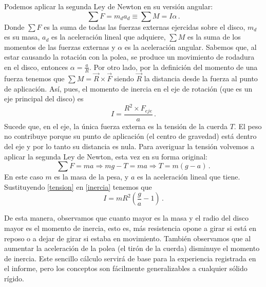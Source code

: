 \documentclass[a4paper]{article}
\begin{document}
Podemos aplicar la segunda Ley de Newton en su versión angular:
\begin{equation}
\sum F=m_d a_d\equiv \sum M=I\alpha\,.
\end{equation}
Donde $\sum F$ es la suma de todas las fuerzas externas ejercidas sobre el disco, $m_d$ es su masa, $a_d$ es la aceleración lineal que adquiere, $\sum M$ es la suma de los momentos de las fuerzas externas  y $\alpha$ es la aceleración angular.
Sabemos que, al estar causando la rotación con la polea, se produce un movimiento de rodadura en el disco, entonces $\alpha=\frac{a}{R}$. Por otro lado, por la definición del momento de una fuerza tenemos que $\sum M=\vec{R}\times\vec{F}$ siendo $\vec{R}$ la distancia desde la fuerza al punto de aplicación. Así, pues, el momento de inercia en el eje de rotación (que es un eje principal del disco) es 
\begin{equation}
I=\frac{R^2\times F_{eje}}{a}\,.
\label{inercia}
\end{equation}
Sucede que, en el eje, la única fuerza externa es la tensión de la cuerda $T$. El peso no contribuye porque su punto de aplicación (el centro de gravedad) está dentro del eje y por lo tanto su distancia es nula. Para averiguar la tensión volvemos a aplicar la segunda Ley de Newton, esta vez en su forma original:
\begin{equation}
\sum F=ma\Rightarrow mg-T=ma\Rightarrow T=m\left(g-a\right)\,.
\label{tension}
\end{equation}
En este caso $m$ es la masa de la pesa, y $a$ es la aceleración lineal que tiene. Sustituyendo \ref{tension} en \ref{inercia} tenemos que 
\begin{equation}
I=mR^2\left(\frac{g}{a}-1\right)\,.
\label{inerciadisco}
\end{equation}

De esta manera, observamos que cuanto mayor es la masa y el radio del disco mayor es el momento de inercia, esto es, más resistencia opone a girar si está en reposo o a dejar de girar si estaba en movimiento. También observamos que al aumentar la aceleración de la polea (el tirón de la cuerda) disminuye el momento de inercia.
Este sencillo cálculo servirá de base para la experiencia registrada en el informe, pero los conceptos son fácilmente generalizables a cualquier sólido rígido.
\end{document}
